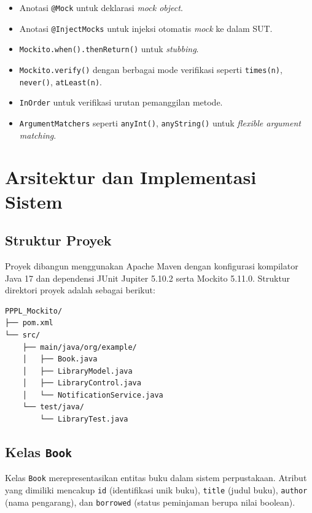\documentclass[12pt,a4paper]{article}
\begin{document}
\begin{itemize}
    \item Anotasi \texttt{@Mock} untuk deklarasi \textit{mock object}.
    \item Anotasi \texttt{@InjectMocks} untuk injeksi otomatis \textit{mock}
          ke dalam SUT.
    \item \texttt{Mockito.when().thenReturn()} untuk \textit{stubbing}.
    \item \texttt{Mockito.verify()} dengan berbagai mode verifikasi seperti
          \texttt{times(n)}, \texttt{never()}, \texttt{atLeast(n)}.
    \item \texttt{InOrder} untuk verifikasi urutan pemanggilan metode.
    \item \texttt{ArgumentMatchers} seperti \texttt{anyInt()},
          \texttt{anyString()} untuk \textit{flexible argument matching}.
\end{itemize}

\section{Arsitektur dan Implementasi Sistem}

\subsection{Struktur Proyek}

Proyek dibangun menggunakan Apache Maven dengan konfigurasi kompilator Java 17
dan dependensi JUnit Jupiter 5.10.2 serta Mockito 5.11.0. Struktur direktori
proyek adalah sebagai berikut:

\begin{verbatim}
PPPL_Mockito/
├── pom.xml
└── src/
    ├── main/java/org/example/
    │   ├── Book.java
    │   ├── LibraryModel.java
    │   ├── LibraryControl.java
    │   └── NotificationService.java
    └── test/java/
        └── LibraryTest.java
\end{verbatim}

\subsection{Kelas \texttt{Book}}

Kelas \texttt{Book} merepresentasikan entitas buku dalam sistem perpustakaan.
Atribut yang dimiliki mencakup \texttt{id} (identifikasi unik buku),
\texttt{title} (judul buku), \texttt{author} (nama pengarang), dan
\texttt{borrowed} (status peminjaman berupa nilai boolean).
\end{document}
